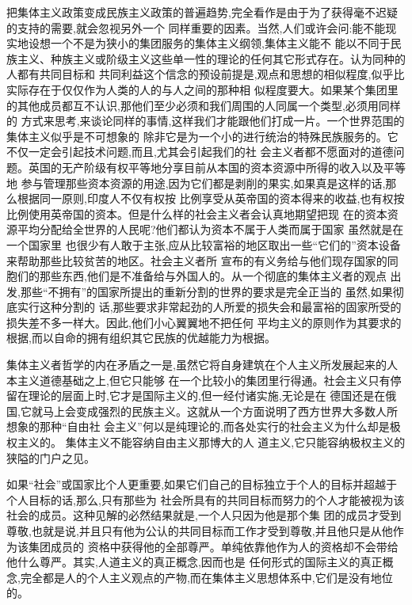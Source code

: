 ﻿\documentclass[12pt]{article}
\begin{document}
把集体主义政策变成民族主义政策的普遍趋势,完全看作是由于为了获得毫不迟疑的支持的需要,就会忽视另外一个
同样重要的因素。当然,人们或许会问:能不能现实地设想一个不是为狭小的集团服务的集体主义纲领,集体主义能不
能以不同于民族主义、种族主义或阶级主义这些单一性的理论的任何其它形式存在。认为同种的人都有共同目标和
共同利益这个信念的预设前提是,观点和思想的相似程度,似乎比实际存在于仅仅作为人类的人的与人之间的那种相
似程度要大。如果某个集团里的其他成员都互不认识,那他们至少必须和我们周围的人同属一个类型,必须用同样的
方式来思考,来谈论同样的事情,这样我们才能跟他们打成一片。一个世界范围的集体主义似乎是不可想象的
\myrule 除非它是为一个小的进行统治的特殊民族服务的。它不仅一定会引起技术问题,而且,尤其会引起我们的社
会主义者都不愿面对的道德问题。英国的无产阶级有权平等地分享目前从本国的资本资源中所得的收入以及平等地
参与管理那些资本资源的用途,因为它们都是剥削的果实,如果真是这样的话,那么根据同一原则,印度人不仅有权按
比例享受从英帝国的资本得来的收益,也有权按比例使用英帝国的资本。但是什么样的社会主义者会认真地期望把现
在的资本资源平均分配给全世界的人民呢?他们都认为资本不属于人类而属于国家 \myrule 虽然就是在一个国家里
也很少有人敢于主张,应从比较富裕的地区取出一些``它们的''资本设备来帮助那些比较贫苦的地区。社会主义者所
宣布的有义务给与他们现存国家的同胞们的那些东西,他们是不准备给与外国人的。从一个彻底的集体主义者的观点
出发,那些``不拥有''的国家所提出的重新分割的世界的要求是完全正当的 \myrule 虽然,如果彻底实行这种分割的
话,那些要求非常起劲的人所爱的损失会和最富裕的固家所受的损失差不多一样大。因此,他们小心翼翼地不把任何
平均主义的原则作为其要求的根据,而以自命的拥有组织其它民族的优越能力为根据。

集体主义者哲学的内在矛盾之一是,虽然它将自身建筑在个人主义所发展起来的人本主义道德基础之上,但它只能够
在一个比较小的集团里行得通。社会主义只有停留在理论的层面上时,它才是国际主义的,但一经付诸实施,无论是在
德国还是在俄国,它就马上会变成强烈的民族主义。这就从一个方面说明了西方世界大多数人所想象的那种``自由社
会主义''何以是纯理论的,而各处实行的社会主义为什么却是极权主义的。 集体主义不能容纳自由主义那博大的人
道主义,它只能容纳极权主义的狭隘的门户之见。

如果``社会''或国家比个人更重要,如果它们自己的目标独立于个人的目标并超越于个人目标的话,那么,只有那些为
社会所具有的共同目标而努力的个人才能被视为该社会的成员。这种见解的必然结果就是,一个人只因为他是那个集
团的成员才受到尊敬,也就是说,并且只有他为公认的共同目标而工作才受到尊敬,并且他只是从他作为该集团成员的
资格中获得他的全部尊严。单纯依靠他作为人的资格却不会带给他什么尊严。其实,人道主义的真正概念,因而也是
任何形式的国际主义的真正概念,完全都是人的个人主义观点的产物,而在集体主义思想体系中,它们是没有地位的。
\end{document}
